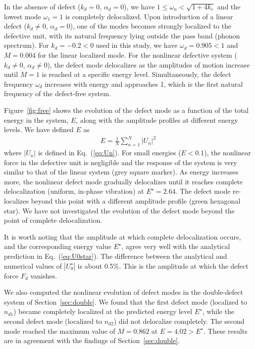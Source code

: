 \documentclass[aps,pre,twocolumn,groupedaddress]{revtex4-1}
\begin{document}
In the absence of defect ($k_d=0$, $\alpha_d=0$), we have $1 \le \omega_n < \sqrt{1+4k_c}$ and the lowest mode $\omega_1=1$ is completely delocalized. Upon introduction of a linear defect ($k_d \ne 0$, $\alpha_d=0$), one of the modes becomes strongly localized to the defective unit, with its natural frequency lying outside the pass band (phonon spectrum). For $k_d=-0.2<0$ used in this study, we have $\omega_d=0.905<1$ and $M=0.004$ for the linear localized mode. For the nonlinear defective system ($k_d \ne 0$, $\alpha_d \ne 0$), the defect mode delocalizes as the amplitudes of motion increase until $M=1$ is reached at a specific energy level. Simultaneously, the defect frequency $\omega_d$ increases with energy and approaches 1, which is the first natural frequency of the defect-free system. 

Figure~\ref{fig:free} shows the evolution of the defect mode as a function of the total energy in the system, $E$, along with the amplitude profiles at different energy levels. We have defined $E$ as 
\begin{eqnarray*}
	E = \frac{1}{N} \sum_{n=1}^N |U_n|^2
\end{eqnarray*}
where $|U_n|$ is defined in Eq.~(\ref{eq:Un}). For small energies ($E<0.1$), the nonlinear force in the defective unit is negligible and the response of the system is very similar to that of the linear system (grey square marker). As energy increases more, the nonlinear defect mode gradually delocalizes until it reaches complete delocalization (uniform, in-phase vibration) at $E^{\star}=2.64$. 
The defect mode re-localizes beyond this point with a different amplitude profile (green hexagonal star). We have not investigated the evolution of the defect mode beyond the point of complete delocalization. 

It is worth noting that the amplitude at which complete delocalization occurs, and the corresponding energy value $E^{\star}$, agree very well with the analytical prediction in Eq.~(\ref{eq:U0star}). The difference between the analytical and numerical values of $|U_0^{\star}|$ is about 0.5\%. This is the amplitude at which the defect force $F_d$ vanishes. 


We also computed the nonlinear evolution of defect modes in the double-defect system of Section~\ref{sec:double}. We found that the first defect mode (localized to $n_{d1}$) became completely localized at the predicted energy level $E^{\star}$, while the second defect mode (localized to $n_{d2}$) did not delocalize completely. The second mode reached the maximum value of $M=0.862$ at $E=4.02>E^{\star}$. These results are in  agreement with the findings of Section~\ref{sec:double}. 
\end{document}
